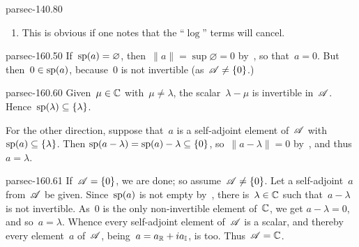 \documentclass[b5page]{book}
\begin{document}
\begin{solution}{parsec-140.80}
\begin{enumerate}
Similarly, \eqref{eq:14VIII}
follows easily from the first integral computed in point~2
when $\Real{w}=\Real{w'}$.

For the general case we consider
the triangle~$T$ with vertices~$w$, $w'$ and~$w''$
where either $w''=\Real{w}'+i\Imag{w}$
or 
$w''=\Real{w}+i\Imag{w}'$
such that~$0$ is not on the closure of~$T$.
Then Goursat's Theorem, 
implies that
\begin{equation*}
    \int_w^{w''} z^{-1}\,dz  \ +\ 
    \int_{w''}^{w'} z^{-1}\,dz \ +\ 
    \int_{w'}^{w} z^{-1}\,dz\ = \ 0,
\end{equation*}
and so
\begin{alignat*}{3}
    \int_{w}^{w'} z^{-1}\,dz \ &= \ 
    \int_w^{w''} z^{-1}\,dz  \ +\ 
    \int_{w''}^{w'} z^{-1}\,dz \\
    &=\ i\measuredangle(w,0,w'')\ 
    +\ \log\frac{\left|w''\right|}{\left|w\right|}
    \ +\ \ i\measuredangle(w'',0,w')\ 
    +\ \log\frac{\left|w'\right|}{\left|w''\right|}\\
    &=\ i(\,\measuredangle(w,0,w'')\,+\measuredangle(w'',0,w')\,)\ 
    +\ \log\frac{\left|w''\right|}{\left|w\right|}\frac{\left|w'\right|}{\left|w''\right|}\\
    &=\ i\measuredangle(w,0,w')\ 
    +\ \log\frac{\left|w'\right|}{\left|w\right|}.
\end{alignat*}
\item
This is obvious if one notes
that the ``$\log$'' terms  will cancel.
\end{enumerate}
\end{solution}
\begin{solution}{parsec-160.50}%
    If~$\mathrm{sp}(a)=\varnothing$,
    then~$\|a\|=\sup\varnothing=0$ by~,
    so that~$a=0$.
    But then~$0\in\mathrm{sp}(a)$,
    because~$0$ is not invertible (as~$\mathscr{A}\neq\{0\}$.)
\end{solution}
\begin{solution}{parsec-160.60}%
Given~$\mu\in \mathbb{C}$ with~$\mu\neq\lambda$,
the scalar~$\lambda-\mu$ is invertible in~$\mathscr{A}$.
Hence~$\mathrm{sp}(\lambda)\subseteq\{\lambda\}$.

For the other direction,
suppose that~$a$ is a self-adjoint element of~$\mathscr{A}$
    with $\mathrm{sp}(a)\subseteq\{\lambda\}$.
Then $\mathrm{sp}(a-\lambda)=\mathrm{sp}(a)-\lambda \subseteq \{0\}$,
    so~$\|a-\lambda\|=0$
    by~\sref{parsec-160.20},
    and thus~$a=\lambda$.
\end{solution}
\begin{solution}{parsec-160.61}
    If~$\mathscr{A}=\{0\}$, we are done; so assume~$\mathscr{A}\neq\{0\}$.
    Let a self-adjoint~$a$ from~$\mathscr{A}$ be given.
    Since~$\mathrm{sp}(a)$ is not empty by~\sref{parsec-160.50},
    there is~$\lambda\in\mathbb{C}$ such that~$a-\lambda$ is not invertible.
    As~$0$ is the only non-invertible element of~$\mathbb{C}$,
    we get $a-\lambda = 0$, and so~$a=\lambda$.
    Whence every self-adjoint element of~$\mathscr{A}$ is a scalar,
    and thereby every element~$a$ of~$\mathscr{A}$,
    being~$a=a_{\mathbb{R}}+ia_{\mathbb{I}}$, is too.
    Thus~$\mathscr{A}=\mathbb{C}$.
\end{solution}
\end{document}
